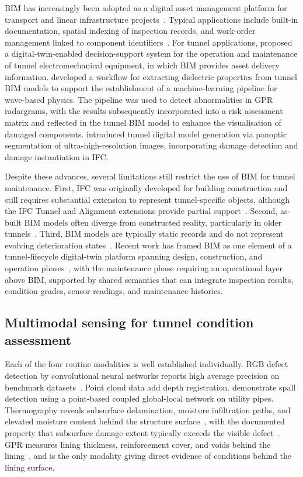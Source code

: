 \documentclass[11pt,a4paper]{article}
\begin{document}
BIM has increasingly been adopted as a digital asset management platform for transport and linear infrastructure projects~\citep{huang2021,Huang2022}. Typical applications include built-in documentation, spatial indexing of inspection records, and work-order management linked to component identifiers~\citep{Cheng2020,Hagedorn2023,Byun2021}. For tunnel applications, \citet{Yu2023} proposed a digital-twin-enabled decision-support system for the operation and maintenance of tunnel electromechanical equipment, in which BIM provides asset delivery information. \citet{Zhu2024} developed a workflow for extracting dielectric properties from tunnel BIM models to support the establishment of a machine-learning pipeline for wave-based physics. The pipeline was used to detect abnormalities in GPR radargrams, with the results subsequently incorporated into a risk assessment matrix and reflected in the tunnel BIM model to enhance the visualisation of damaged components. \citet{Ye2026} introduced tunnel digital model generation via panoptic segmentation of ultra-high-resolution images, incorporating damage detection and damage instantiation in IFC.

Despite these advances, several limitations still restrict the use of BIM for tunnel maintenance. First, IFC was originally developed for building construction and still requires substantial extension to represent tunnel-specific objects, although the IFC Tunnel and Alignment extensions provide partial support~\citep{Borrmann2018}. Second, as-built BIM models often diverge from constructed reality, particularly in older tunnels~\citep{Ye2025}. Third, BIM models are typically static records and do not represent evolving deterioration states~\citep{Zhu2025}. Recent work has framed BIM as one element of a tunnel-lifecycle digital-twin platform spanning design, construction, and operation phases~\citep{huang2025,xiao2025}, with the maintenance phase requiring an operational layer above BIM, supported by shared semantics that can integrate inspection results, condition grades, sensor readings, and maintenance histories.

\subsection{Multimodal sensing for tunnel condition assessment}

Each of the four routine modalities is well established individually. RGB defect detection by convolutional neural networks reports high average precision on benchmark datasets~\citep{Cha2017,Li2019,Zhao2020}. Point cloud data add depth registration. \citet{Wu2025} demonstrate spall detection using a point-based coupled global-local network on utility pipes. Thermography reveals subsurface delamination, moisture infiltration paths, and elevated moisture
content behind the structure surface~\citep{Konishi2016,Jiang2026}, with the documented property that subsurface damage extent typically exceeds the visible defect~\citep{Poncetti2025}. GPR measures lining thickness, reinforcement cover, and voids behind the lining~\citep{Solla2021,Lai2018,Benedetto2017,Luo2024}, and is the only modality giving direct evidence of conditions behind the lining surface.
\end{document}
